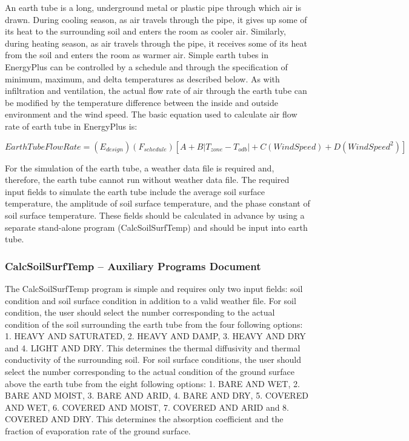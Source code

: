 An earth tube is a long, underground metal or plastic pipe through which air is drawn. During cooling season, as air travels through the pipe, it gives up some of its heat to the surrounding soil and enters the room as cooler air. Similarly, during heating season, as air travels through the pipe, it receives some of its heat from the soil and enters the room as warmer air. Simple earth tubes in EnergyPlus can be controlled by a schedule and through the specification of minimum, maximum, and delta temperatures as described below. As with infiltration and ventilation, the actual flow rate of air through the earth tube can be modified by the temperature difference between the inside and outside environment and the wind speed. The basic equation used to calculate air flow rate of earth tube in EnergyPlus is:

\begin{equation}
EarthTubeFlowRate = \left( {{E_{design}}} \right)\left( {{F_{schedule}}} \right)\left[ {A + B\left| {{T_{zone}} - {T_{odb}}} \right| + C\left( {WindSpeed} \right) + D\left( {WindSpee{d^2}} \right)} \right]
\end{equation}

For the simulation of the earth tube, a weather data file is required and, therefore, the earth tube cannot run without weather data file. The required input fields to simulate the earth tube include the average soil surface temperature, the amplitude of soil surface temperature, and the phase constant of soil surface temperature. These fields should be calculated in advance by using a separate stand-alone program (CalcSoilSurfTemp) and should be input into earth tube.

\subsubsection{CalcSoilSurfTemp -- Auxiliary Programs Document}\label{calcsoilsurftemp-auxiliary-programs-document}

The CalcSoilSurfTemp program is simple and requires only two input fields: soil condition and soil surface condition in addition to a valid weather file. For soil condition, the user should select the number corresponding to the actual condition of the soil surrounding the earth tube from the four following options: 1. HEAVY AND SATURATED, 2. HEAVY AND DAMP, 3. HEAVY AND DRY and 4. LIGHT AND DRY. This determines the thermal diffusivity and thermal conductivity of the surrounding soil. For soil surface conditions, the user should select the number corresponding to the actual condition of the ground surface above the earth tube from the eight following options: 1. BARE AND WET, 2. BARE AND MOIST, 3. BARE AND ARID, 4. BARE AND DRY, 5. COVERED AND WET, 6. COVERED AND MOIST, 7. COVERED AND ARID and 8. COVERED AND DRY. This determines the absorption coefficient and the fraction of evaporation rate of the ground surface.

